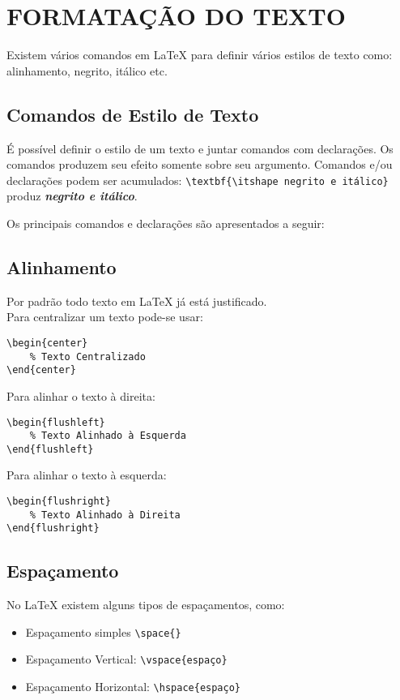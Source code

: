 
\chapter{FORMATAÇÃO DO TEXTO}

Existem vários comandos em \LaTeX{} para definir vários estilos de texto como: alinhamento, negrito, itálico etc.

\section{Comandos de Estilo de Texto}

É possível definir o estilo de um texto e juntar comandos com declarações.
Os comandos produzem seu efeito somente sobre seu argumento.
Comandos e/ou declarações podem ser acumulados: \verb|\textbf{\itshape negrito e itálico}| produz \textbf{\itshape negrito e itálico}.

Os principais comandos e declarações são apresentados a seguir:



\section{Alinhamento}

Por padrão todo texto em \LaTeX{} já está justificado.\\

Para centralizar um texto pode-se usar:

\begin{verbatim}
\begin{center}
    % Texto Centralizado
\end{center}
\end{verbatim}

Para alinhar o texto à direita:

\begin{verbatim}
\begin{flushleft}
    % Texto Alinhado à Esquerda
\end{flushleft}
\end{verbatim}

Para alinhar o texto à esquerda:

\begin{verbatim}
\begin{flushright}
    % Texto Alinhado à Direita
\end{flushright}
\end{verbatim}

\section{Espaçamento}

No LaTeX existem alguns tipos de espaçamentos, como: \\

 \begin{itemize}
    \item Espaçamento simples \verb|\space{}|
    \item Espaçamento Vertical: \verb|\vspace{espaço}|
    \item Espaçamento Horizontal: \verb|\hspace{espaço}|
\end{itemize}

